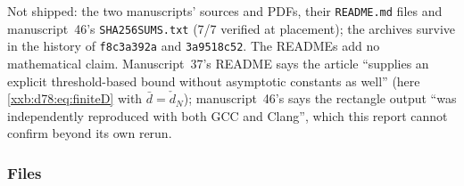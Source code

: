 \documentclass[11pt,a4paper]{article}
\numberwithin{equation}{section}
\theoremstyle{definition}
\theoremstyle{remark}
\theoremstyle{plain}
\begin{document}
Not shipped: the two manuscripts' sources and PDFs, their \texttt{README.md}
files and manuscript~46's \texttt{SHA256SUMS.txt} (7/7 verified at placement);
the archives survive in the history of \texttt{f8c3a392a} and
\texttt{3a9518c52}.  The READMEs add no mathematical claim.  Manuscript~37's
README says the article ``supplies an explicit threshold-based bound without
asymptotic constants as well'' (here \eqref{xxb:d78:eq:finiteD} with
$\bar d=\check d_N$); manuscript~46's says the rectangle output ``was
independently reproduced with both GCC and Clang'', which this report cannot
confirm beyond its own rerun.

\subsubsection{Files}
\end{document}
